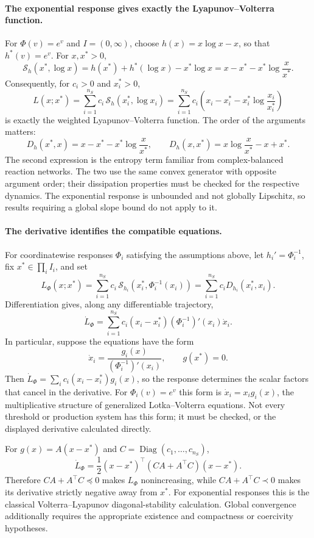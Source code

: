 \paragraph{The exponential response gives exactly the Lyapunov--Volterra function.}
For $\Phi(v)=e^v$ and $I=(0,\infty)$, choose $h(x)=x\log x-x$, so that $h^*(v)=e^v$. For $x,x^*>0$,
\[
 \mathcal S_h(x^*,\log x)=h(x^*)+h^*(\log x)-x^*\log x=x-x^*-x^*\log\frac{x}{x^*}.
\]
Consequently, for $c_i>0$ and $x_i^*>0$,
\[
 L(x;x^*)=\sum_{i=1}^{n_S}c_i\,\mathcal S_h(x_i^*,\log x_i)
 =\sum_{i=1}^{n_S}c_i\left(x_i-x_i^*-x_i^*\log\frac{x_i}{x_i^*}\right)
\]
is exactly the weighted Lyapunov--Volterra function. The order of the arguments matters:
\[
 D_h(x^*,x)=x-x^*-x^*\log\frac{x}{x^*},\qquad
 D_h(x,x^*)=x\log\frac{x}{x^*}-x+x^*.
\]
The second expression is the entropy term familiar from complex-balanced reaction networks. The two
use the same convex generator with opposite argument order; their dissipation properties must be
checked for the respective dynamics. The exponential response is unbounded and not globally
Lipschitz, so results requiring a global slope bound do not apply to it.

\paragraph{The derivative identifies the compatible equations.}
For coordinatewise responses $\Phi_i$ satisfying the assumptions above, let $h_i'=\Phi_i^{-1}$, fix
$x^*\in\prod_iI_i$, and set
\[
 L_\Phi(x;x^*)=\sum_{i=1}^{n_S}c_i\,\mathcal S_{h_i}(x_i^*,\Phi_i^{-1}(x_i))
 =\sum_{i=1}^{n_S}c_iD_{h_i}(x_i^*,x_i).
\]
Differentiation gives, along any differentiable trajectory,
\[
 \dot L_\Phi=\sum_{i=1}^{n_S}c_i(x_i-x_i^*)(\Phi_i^{-1})'(x_i)\dot x_i.
\]
In particular, suppose the equations have the form
\[
 \dot x_i=\frac{g_i(x)}{(\Phi_i^{-1})'(x_i)},\qquad g(x^*)=0.
\]
Then $\dot L_\Phi=\sum_ic_i(x_i-x_i^*)g_i(x)$, so the response determines the scalar factors that
cancel in the derivative. For $\Phi_i(v)=e^v$ this form is $\dot x_i=x_ig_i(x)$, the multiplicative
structure of generalized Lotka--Volterra equations. Not every threshold or production system has
this form; it must be checked, or the displayed derivative calculated directly.

For $g(x)=A(x-x^*)$ and $C=\operatorname{Diag}(c_1,\ldots,c_{n_S})$,
\[
 \dot L_\Phi=\frac12(x-x^*)^\top(CA+A^\top C)(x-x^*).
\]
Therefore $CA+A^\top C\preceq0$ makes $L_\Phi$ nonincreasing, while $CA+A^\top C\prec0$ makes its
derivative strictly negative away from $x^*$. For exponential responses this is the classical
Volterra--Lyapunov diagonal-stability calculation. Global convergence additionally requires the
appropriate existence and compactness or coercivity hypotheses.

